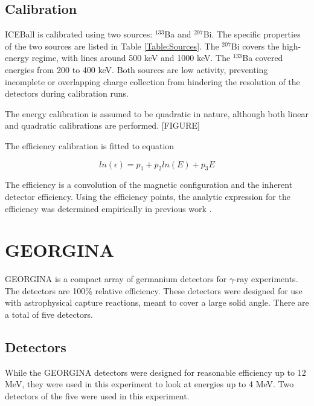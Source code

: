 



\subsection{Calibration}

ICEBall is calibrated using two sources: $^{133}$Ba and $^{207}$Bi. The specific properties of the two sources are listed in Table \ref{Table:Sources}. The $^{207}$Bi covers the high-energy regime, with lines around 500 keV and 1000 keV. The $^{133}$Ba covered energies from 200 to 400 keV. Both sources are low activity, preventing incomplete or overlapping charge collection from hindering the resolution of the detectors during calibration runs.



The energy calibration is assumed to be quadratic in nature, although both linear and quadratic calibrations are performed. [FIGURE]

The efficiency calibration is fitted to equation

\begin{equation}
    ln(\epsilon) = p_1+p_2ln(E)+p_3E
    \label{eq:SiLi_Eff}
\end{equation}

The efficiency is a convolution of the magnetic configuration and the inherent detector efficiency. Using the efficiency points, the analytic expression for the efficiency was determined empirically in previous work \citep{battaglia15:_iceball_176lu}.

\section{GEORGINA}

GEORGINA is a compact array of germanium detectors for $\gamma$-ray experiments\citep{isnap18:_georgina}. The detectors are 100\% relative efficiency. These detectors were designed for use with astrophysical capture reactions, meant to cover a large solid angle. There are a total of five detectors.

\subsection{Detectors}

While the GEORGINA detectors were designed for reasonable efficiency up to 12 MeV, they were used in this experiment to look at energies up to 4 MeV. Two detectors of the five were used in this experiment. 

